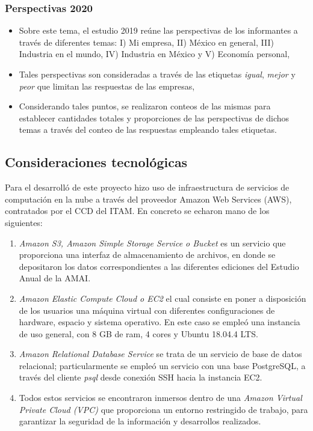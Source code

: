\subsubsection{Perspectivas 2020}

\begin{itemize}
\item Sobre este tema, el estudio 2019 reúne las perspectivas de los informantes a través de diferentes temas: I) Mi empresa, II) México en general, III) Industria en el mundo, IV) Industria en México y  V) Economía personal,
\item Tales perspectivas son consideradas a través de las etiquetas \emph{igual}, \emph{mejor} y \emph{peor} que limitan las respuestas de las empresas,
\item Considerando tales puntos, se realizaron conteos de las mismas para establecer cantidades totales y proporciones de las perspectivas de dichos temas a través del conteo de las respuestas empleando tales etiquetas.
\end{itemize}

\subsection{Consideraciones tecnológicas}

Para el desarrolló de este proyecto hizo uso de infraestructura de servicios de computación en la nube a través del proveedor Amazon Web Services (AWS), contratados por el CCD del ITAM. En concreto se echaron mano de los siguientes:

\begin{enumerate}
    \item \emph{Amazon S3, Amazon Simple Storage Service o Bucket} es un servicio que proporciona una interfaz de almacenamiento de archivos, en donde se depositaron los datos correspondientes a las diferentes ediciones del Estudio Anual de la AMAI. 
    \item \emph{Amazon Elastic Compute Cloud  o EC2} el cual consiste en poner a disposición de los usuarios una máquina virtual con diferentes configuraciones de hardware, espacio y sistema operativo. En este caso se empleó una instancia de uso general, con 8 GB de ram, 4 cores y Ubuntu 18.04.4 LTS.
    \item \emph{Amazon Relational Database Service} se trata de un servicio de base de datos relacional; particularmente se empleó un servicio con una base PostgreSQL, a través del cliente \emph{psql} desde conexión SSH hacia la instancia EC2. 
    \item Todos estos servicios se encontraron inmersos dentro de una \emph{Amazon Virtual Private Cloud (VPC)} que proporciona un entorno restringido de trabajo, para garantizar la seguridad de la información y desarrollos realizados.
\end{enumerate}

